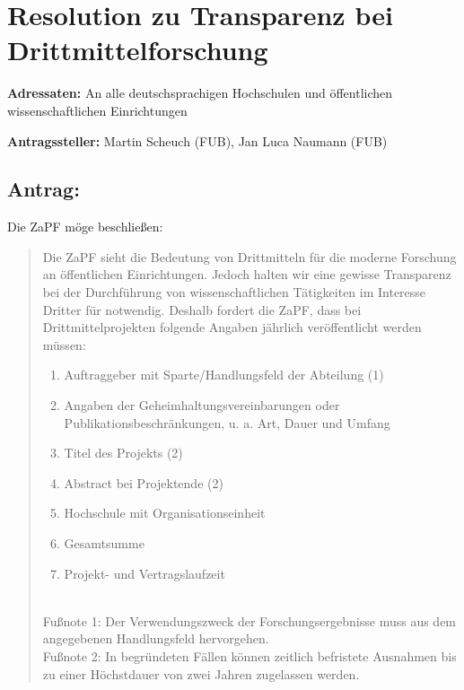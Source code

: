 \documentclass[10pt,oneside]{scrartcl}
\begin{document}
\section*{Resolution zu Transparenz bei Drittmittelforschung}

\textbf{Adressaten:} An alle deutschsprachigen Hochschulen und öffentlichen wissenschaftlichen Einrichtungen

\textbf{Antragssteller:} Martin Scheuch (FUB), Jan Luca Naumann (FUB)

\subsection*{Antrag:}
Die ZaPF möge beschließen:
\begin{quote}
Die ZaPF sieht die Bedeutung von Drittmitteln für die moderne Forschung an öffentlichen Einrichtungen. Jedoch halten wir eine gewisse Transparenz bei der Durchführung von wissenschaftlichen Tätigkeiten im Interesse Dritter für notwendig. Deshalb fordert die ZaPF, dass bei Drittmittelprojekten folgende Angaben jährlich veröffentlicht werden müssen:
\begin{enumerate}
\item Auftraggeber mit Sparte/Handlungsfeld der Abteilung (1)
\item Angaben der Geheimhaltungsvereinbarungen oder Publikationsbeschränkungen, u. a. Art, Dauer und Umfang
\item Titel des Projekts (2)
\item Abstract bei Projektende (2)
\item Hochschule mit Organisationseinheit
\item Gesamtsumme
\item Projekt- und Vertragslaufzeit 
\end{enumerate}
~\\
Fußnote 1: Der Verwendungszweck der Forschungsergebnisse muss aus dem angegebenen Handlungsfeld hervorgehen.\\

Fußnote 2: In begründeten Fällen können zeitlich befristete Ausnahmen bis zu einer Höchstdauer von zwei Jahren zugelassen werden.\\


\end{quote}
\end{document}
